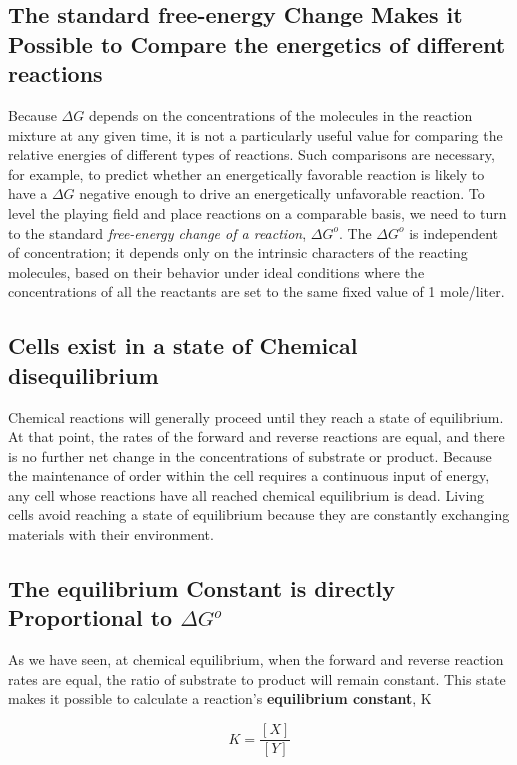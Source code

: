 \subsection{The standard free-energy Change Makes it Possible to Compare the energetics of different reactions}

Because $\Delta G$ depends on the concentrations of the molecules in the reaction
mixture at any given time, it is not a particularly useful value for
comparing the relative energies of different types of reactions. Such comparisons
are necessary, for example, to predict whether an energetically
favorable reaction is likely to have a $\Delta G$ negative enough to drive an
energetically unfavorable reaction. To level the playing field and place
reactions on a comparable basis, we need to turn to the standard \textit{free-energy
change of a reaction}, \textbf{$\Delta G^{o}$}. The $\Delta G^{o}$ is independent of concentration; it
depends only on the intrinsic characters of the reacting molecules, based
on their behavior under ideal conditions where the concentrations of all
the reactants are set to the same fixed value of 1 mole/liter.

\subsection{Cells exist in a state of Chemical disequilibrium}

Chemical reactions will generally proceed until they reach a state of
equilibrium. At that point, the rates of the forward and reverse reactions
are equal, and there is no further net change in the concentrations of
substrate or product. Because the maintenance of order within the cell
requires a continuous input of energy, any cell whose reactions have all
reached chemical equilibrium is dead.
Living cells avoid reaching a state of equilibrium because they are constantly
exchanging materials with their environment.

\subsection{The equilibrium Constant is directly Proportional to $\Delta G^{o}$}

As we have seen, at chemical equilibrium, when the forward and reverse
reaction rates are equal, the ratio of substrate to product will remain constant.
This state makes it possible to calculate a reaction’s \textbf{equilibrium
constant}, K

\begin{equation}
K = \frac{[X]}{[Y]}
\end{equation}

